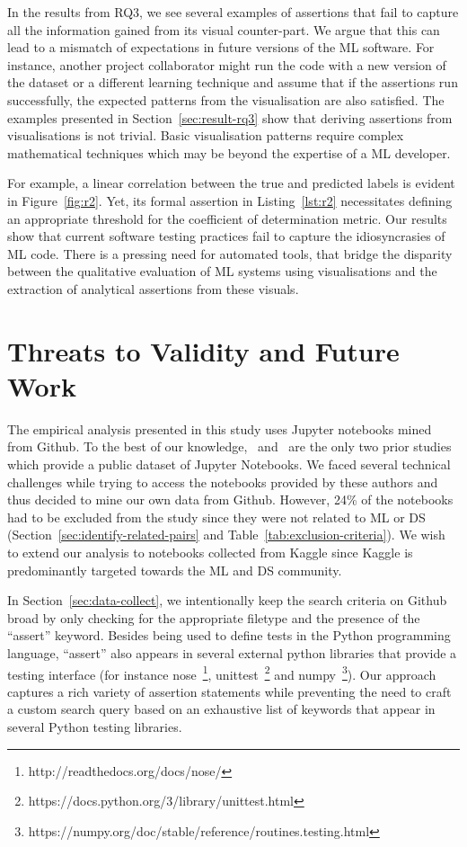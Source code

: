 \documentclass[conference]{IEEEtran}
\begin{document}
In the results from RQ3, we see several examples of assertions that fail to capture all the information gained from its visual counter-part. We argue that this can lead to a mismatch of expectations in future versions of the ML software. For instance, another project collaborator might run the code with a new version of the dataset or a different learning technique and assume that if the assertions run successfully, the expected patterns from the visualisation are also satisfied. The examples presented in Section~\ref{sec:result-rq3} show that deriving assertions from visualisations is not trivial. Basic visualisation patterns require complex mathematical techniques which may be beyond the expertise of a ML developer. 

For example, a linear correlation between the true and predicted labels is evident in Figure~\ref{fig:r2}. Yet, its formal assertion in Listing~\ref{lst:r2} necessitates defining an appropriate threshold for the coefficient of determination metric. Our results show that current software testing practices fail to capture the idiosyncrasies of ML code. There is a pressing need for automated tools, that bridge the disparity between the qualitative evaluation of ML systems using visualisations and the extraction of analytical assertions from these visuals. 

\section{Threats to Validity and Future Work}\label{sec:threats}

The empirical analysis presented in this study uses Jupyter notebooks mined from Github. To the best of our knowledge,~\cite{pimentel2019large} and~\cite{quaranta2021kgtorrent} are the only two prior studies which provide a public dataset of Jupyter Notebooks. We faced several technical challenges while trying to access the notebooks provided by these authors and thus decided to mine our own data from Github. However, 24\% of the notebooks had to be excluded from the study since they were not related to ML or DS (Section~\ref{sec:identify-related-pairs} and Table~\ref{tab:exclusion-criteria}). We wish to extend our analysis to notebooks collected from Kaggle since Kaggle is predominantly targeted towards the ML and DS community.

In Section~\ref{sec:data-collect}, we intentionally keep the search criteria on Github broad by only checking for the appropriate filetype and the presence of the ``assert'' keyword. Besides being used to define tests in the Python programming language, ``assert'' also appears in several external python libraries that provide a testing interface (for instance nose~\footnote{http://readthedocs.org/docs/nose/}, unittest~\footnote{https://docs.python.org/3/library/unittest.html} and numpy~\footnote{https://numpy.org/doc/stable/reference/routines.testing.html}). Our approach captures a rich variety of assertion statements while preventing the need to craft a custom search query based on an exhaustive list of keywords that appear in several Python testing libraries.
\end{document}
